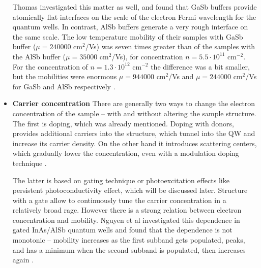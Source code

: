 \documentclass[titlepage,a4paper]{book}
\begin{document}
\begin{itemize}
Thomas investigated this matter as well, and found that GaSb buffers provide atomically flat interfaces on the scale of the electron Fermi wavelength for the quantum wells. In contrast, AlSb buffers generate a very rough interface on the same scale. The low temperature mobility of their samples with GaSb buffer ($\mu = 240000$ cm$^2$/Vs) was seven times greater than of the samples with the AlSb buffer ($\mu = 35000$ cm$^2$/Vs), for concentration $n = 5.5 \cdot 10^{11}$ cm$^{-2}$. For the concentration of $n = 1.3 \cdot 10^{12}$ cm$^{-2}$ the difference was a bit smaller, but the mobilities were enormous $\mu = 944000$ cm$^2$/Vs and $\mu = 244000$ cm$^2$/Vs for GaSb and AlSb respectively \cite{Nguyen_Mobility}\cite{Thomas_Buffer}\cite{Nguyen_Buffer}.

\item \textbf{Carrier concentration} \newline
There are generally two ways to change the electron concentration of the sample -- with and without altering the sample structure. The first is doping, which was already mentioned. Doping with donors, provides additional carriers into the structure, which tunnel into the QW and increase its carrier density. On the other hand it introduces scattering centers, which gradually lower the concentration, even with a modulation doping technique \cite{Nguyen_Buffer}. 

The latter is based on gating technique or photoexcitation effects like persistent photoconductivity effect, which will be discussed later. Structure with a gate allow to continuously tune the carrier concentration in a relatively broad rage. However there is a strong relation between electron concentration and mobility. Nguyen et al investigated this dependence in gated InAs/AlSb quantum wells and found that the dependence is not monotonic -- mobility increases as the first subband gets populated, peaks, and has a minimum when the second subband is populated, then increases again \cite{Nguyen_Mobility}.

\end{itemize}
\end{document}
